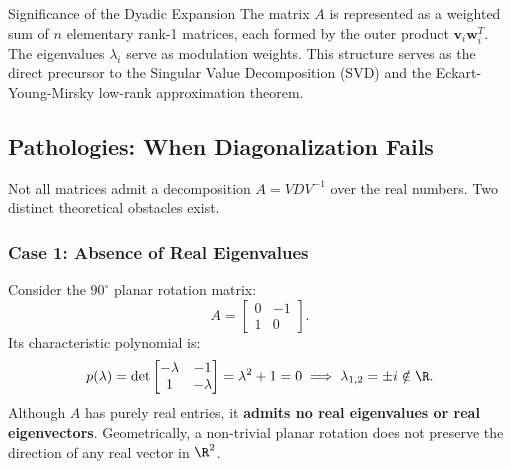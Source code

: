 \begin{noteblock}{Significance of the Dyadic Expansion}
The matrix $A$ is represented as a weighted sum of $n$ elementary rank-1 matrices, each formed by the outer product $\mathbf{v}_i \mathbf{w}_i^T$. The eigenvalues $\lambda_i$ serve as modulation weights. This structure serves as the direct precursor to the Singular Value Decomposition (SVD) and the Eckart-Young-Mirsky low-rank approximation theorem.
\end{noteblock}

\subsection{Pathologies: When Diagonalization Fails}

Not all matrices admit a decomposition $A = V D V^{-1}$ over the real numbers. Two distinct theoretical obstacles exist.

\subsubsection{Case 1: Absence of Real Eigenvalues}
Consider the $90^\circ$ planar rotation matrix:
\begin{equation}
    A = \begin{bmatrix} 0 & -1 \\ 1 & 0 \end{bmatrix}.
\end{equation}
Its characteristic polynomial is:
\begin{equation}
    p(\lambda) = \det \begin{bmatrix} -\lambda & -1 \\ 1 & -\lambda \end{bmatrix} = \lambda^2 + 1 = 0 \implies \lambda_{1,2} = \pm i \notin \R.
\end{equation}
Although $A$ has purely real entries, it \textbf{admits no real eigenvalues or real eigenvectors}. Geometrically, a non-trivial planar rotation does not preserve the direction of any real vector in $\R^2$.

